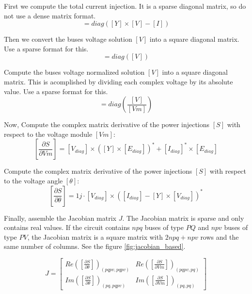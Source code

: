 \documentclass[nols,a4paper,twoside,notoc,fleqn]{tufte-book}
\begin{document}
First we compute the total current injection. It is a sparse diagonal matrix, so do not use a dense matrix format.
\begin{equation}
[I_{diag}] = diag([Y] \times [V] - [I])
\end{equation}

Then we convert the buses voltage solution $[V]$ into a square diagonal matrix. Use a sparse format for this.
\begin{equation}
[V_{diag}] = diag([V])
\end{equation}

Compute the buses voltage normalized solution $[V]$ into a square diagonal matrix. This is acomplished by dividing each complex voltage by its absolute value. Use a sparse format for this.
\begin{equation}
[E_{diag}] = diag\left(\frac{[V]}{[Vm]}\right)
\end{equation}


Now, Compute the complex matrix derivative of the power injections $[S]$ with respect to the voltage module $[Vm]$:
\begin{equation}
\left[\frac{\partial S}{\partial Vm}\right] = [V_{diag}] \times \left([Y] \times [E_{diag}] \right)^* + [I_{diag}]^* \times  [E_{diag}]
\end{equation}
    
Compute the complex matrix derivative of the power injections $[S]$ with respect to the voltage angle $[\theta]$:
\begin{equation}
\left[\frac{\partial S}{\partial \theta}\right] = 1j \cdot [V_{diag}] \times  \left([I_{diag}] - [Y] \times [V_{diag}] \right)^*
\end{equation}

Finally, assemble the Jacobian matrix $J$. The Jacobian matrix is sparse and only contains real values. If the circuit contains $npq$ buses of type $PQ$ and $npv$ buses of type $PV$, the Jacobian matrix is a square matrix with $2 npq + npv$ rows and the same number of columns. See the figure \ref{fig:jacobian_based}.


\begin{equation}
J=
\left[
\begin{array}{cc}
Re\left(\left[\frac{\partial S}{\partial \theta}\right]\right)_{(pqpv, pqpv)} &
Re\left(\left[\frac{\partial S}{\partial Vm}\right]\right)_{(pqpv, pq)} \\
Im\left(\left[\frac{\partial S}{\partial \theta}\right]\right)_{(pq, pqpv)} &
Im\left(\left[\frac{\partial S}{\partial Vm}\right]\right)_{(pq,pq)}
\end{array}
\right]
\end{equation}
\end{document}
